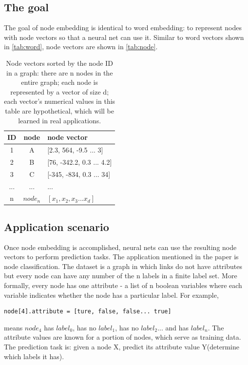 \documentclass{article}
\begin{document}
\subsection{The goal}
The goal of node embedding is identical to word embedding: to represent nodes with node vectors so that a neural net can use it. Similar to word vectors shown in \autoref{tab:word}, node vectors are shown in \autoref{tab:node}.
\begin{table}[h]
	\centering
	\begin{tabularx}{0.5\textwidth}{|c|c|X|} \hline
		ID & node & node vector \\ \hline
		1 & A & [2.3, 564, -9.5 ... 3] \\ \hline
		2 & B & [76, -342.2, 0.3 ... 4.2] \\ \hline
		3 & C & [-345, -834, 0.3 ... 34] \\ \hline
		... & ... & ... \\ \hline
		n & $ node_n $ & $ [x_1, x_2, x_3 ... x_d] $ \\ \hline
	\end{tabularx}
	\caption{Node vectors sorted by the node ID in a graph: there are n nodes in the entire graph; each node is represented by a vector of size d; each vector's numerical values in this table are hypothetical, which will be learned in real applications.}
	\label{tab:node}
\end{table}

\subsection{Application scenario}
Once node embedding is accomplished, neural nets can use the resulting node vectors to perform prediction tasks. The application mentioned in the paper is node classification. The dataset is a graph in which links do not have attributes but every node can have any number of the n labels in a finite label set. More formally, every node has one attribute - a list of n boolean variables where each variable indicates whether the node has a particular label. For example,
\begin{lstlisting}
node[4].attribute = [ture, false, false... true]
\end{lstlisting}
means $ node_4 $ has $ label_0 $, has no $ label_1 $, has no $ label_2 $... and has $ label_n $. The attribute values are known for a portion of nodes, which serve as training data. The prediction task is: given a node X, predict its attribute value Y(determine which labels it has).
\end{document}
